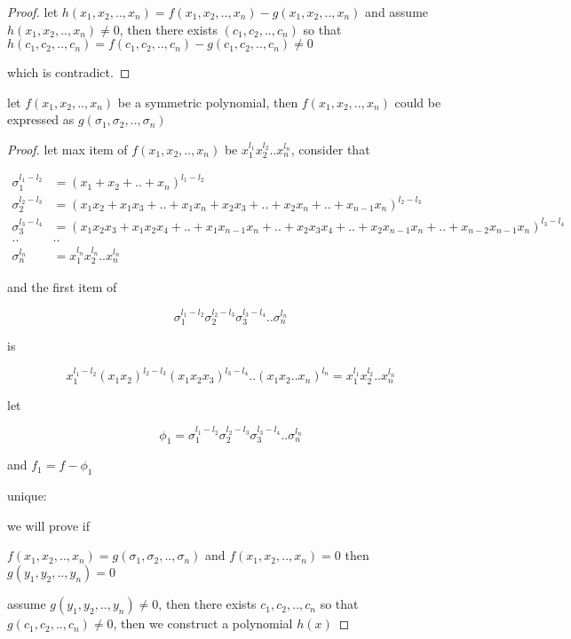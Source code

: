 \begin{proof}
    let $h(x_1,x_2,..,x_n) = f(x_1,x_2,..,x_n) - g(x_1,x_2,..,x_n)$ and assume $h(x_1,x_2,..,x_n) \ne 0$, then there exists $(c_1,c_2,..,c_n)$ so that $h(c_1,c_2,..,c_n) = f(c_1,c_2,..,c_n)- g(c_1,c_2,..,c_n) \ne 0$

    which is contradict.
\end{proof}

\begin{exercise}
    let $f(x_1,x_2,..,x_n)$ be a symmetric polynomial, then $f(x_1,x_2,..,x_n)$ could be expressed as $g(\sigma_1, \sigma_2,..,\sigma_n)$
\end{exercise}

\begin{proof}
    let max item of $f(x_1,x_2,..,x_n)$ be $x_1^{l_1}x_2^{l_2}..x_n^{l_n}$, consider that

    \begin{align*}
        \sigma_1^{l_1-l_2} &= (x_1 + x_2 + .. +x_n)^{l_1-l_2} \\
        \sigma_2^{l_2-l_3} &= (x_1x_2 + x_1x_3 + .. + x_1x_n + x_2x_3 + .. + x_2x_n + .. + x_{n-1}x_n)^{l_2-l_3} \\
        \sigma_3^{l_3-l_4} &= (x_1x_2x_3 + x_1x_2x_4 +..+ x_1x_{n-1}x_n  + .. + x_2x_3x_4 + .. + x_2x_{n-1}x_n + .. + x_{n-2}x_{n-1}x_n)^{l_3 - l_4} \\
        .. & .. \\
        \sigma_n^{l_n} &= x_1^{l_n}x_2^{l_n} .. x_n^{l_n}
    \end{align*}

    and the first item of 

    \[
        \sigma_1^{l_1-l_2}\sigma_2^{l_2-l_3}\sigma_3^{l_3-l_4} .. \sigma_n^{l_n}
    \]

    is

    \[
        x_1^{l_1-l_2}(x_1x_2)^{l_2-l_3}(x_1x_2x_3)^{l_3-l_4}..(x_1x_2..x_n)^{l_n} = x_1^{l_1}x_2^{l_2}..x_n^{l_n}
    \]

    let 

    \[
        \phi_1 =\sigma_1^{l_1-l_2}\sigma_2^{l_2-l_3}\sigma_3^{l_3-l_4} .. \sigma_n^{l_n}
    \]

    and $f_1 = f - \phi_1$


    unique:

    we will prove if

    $f(x_1,x_2,..,x_n) = g(\sigma_1, \sigma_2,..,\sigma_n)$ and $f(x_1,x_2,..,x_n) = 0$ then $g(y_1,y_2,..,y_n) = 0$

    assume $g(y_1,y_2,..,y_n) \ne 0$, then there exists $c_1,c_2,..,c_n$ so that $g(c_1,c_2,..,c_n) \ne 0$, then we construct a polynomial $h(x)$


\end{proof}
